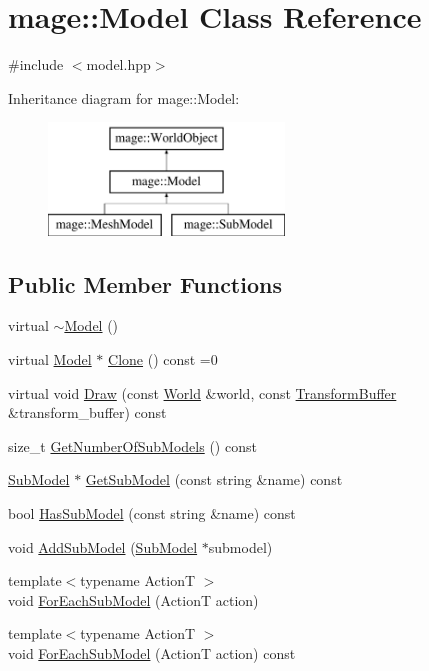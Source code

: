 \hypertarget{classmage_1_1_model}{}\section{mage\+:\+:Model Class Reference}
\label{classmage_1_1_model}


{\ttfamily \#include $<$model.\+hpp$>$}

Inheritance diagram for mage\+:\+:Model\+:\begin{figure}[H]
\begin{center}
\leavevmode
\includegraphics[height=3.000000cm]{classmage_1_1_model}
\end{center}
\end{figure}
\subsection*{Public Member Functions}
\begin{DoxyCompactItemize}
\item 
virtual \hyperlink{classmage_1_1_model_afc6e31cb05ca98c456db56a3e03743d7}{$\sim$\+Model} ()
\item 
virtual \hyperlink{classmage_1_1_model}{Model} $\ast$ \hyperlink{classmage_1_1_model_ae5e9bee52da0db8c7a29920c13ed40ea}{Clone} () const =0
\item 
virtual void \hyperlink{classmage_1_1_model_a0252d4e8ce355600347962c994531a88}{Draw} (const \hyperlink{classmage_1_1_world}{World} \&world, const \hyperlink{structmage_1_1_transform_buffer}{Transform\+Buffer} \&transform\+\_\+buffer) const
\item 
size\+\_\+t \hyperlink{classmage_1_1_model_a29ad2496b11ef5af5f179cfe52943cd3}{Get\+Number\+Of\+Sub\+Models} () const
\item 
\hyperlink{classmage_1_1_sub_model}{Sub\+Model} $\ast$ \hyperlink{classmage_1_1_model_a1cae9eb62a353445d14b5331e88bdeac}{Get\+Sub\+Model} (const string \&name) const
\item 
bool \hyperlink{classmage_1_1_model_a319fb9b9d9c673ed9c83325d5bcbdfd7}{Has\+Sub\+Model} (const string \&name) const
\item 
void \hyperlink{classmage_1_1_model_abf3f207329b5d4482e515e206e856295}{Add\+Sub\+Model} (\hyperlink{classmage_1_1_sub_model}{Sub\+Model} $\ast$submodel)
\item 
{\footnotesize template$<$typename ActionT $>$ }\\void \hyperlink{classmage_1_1_model_a65e9485c22d93506c4ce58836aba931b}{For\+Each\+Sub\+Model} (ActionT action)
\item 
{\footnotesize template$<$typename ActionT $>$ }\\void \hyperlink{classmage_1_1_model_ab50233128bb52002a11f3195b846c830}{For\+Each\+Sub\+Model} (ActionT action) const
\end{DoxyCompactItemize}
